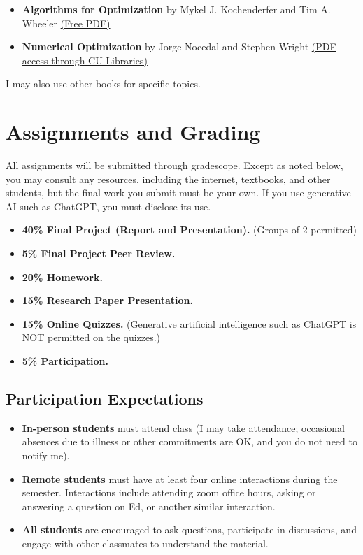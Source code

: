 \documentclass[9pt]{article}
\begin{document}
\begin{itemize}[noitemsep]
    \item \textbf{Algorithms for Optimization} by Mykel J. Kochenderfer and Tim A. Wheeler \href{https://www.algorithmsbook.com/optimization}{(Free PDF)}
    \item \textbf{Numerical Optimization} by Jorge Nocedal and Stephen Wright \href{https://link-springer-com.colorado.idm.oclc.org/book/10.1007/978-0-387-40065-5}{(PDF access through CU Libraries)}
\end{itemize}

I may also use other books for specific topics.

\section*{Assignments and Grading}

All assignments will be submitted through gradescope. Except as noted below, you may consult any resources, including the internet, textbooks, and other students, but the final work you submit must be your own. If you use generative AI such as ChatGPT, you must disclose its use.

\begin{itemize}[noitemsep]
    \item \textbf{40\% Final Project (Report and Presentation).} (Groups of 2 permitted)
    \item \textbf{5\% Final Project Peer Review.}
    \item \textbf{20\% Homework.}
    \item \textbf{15\% Research Paper Presentation.}
    \item \textbf{15\% Online Quizzes.} (Generative artificial intelligence such as ChatGPT is NOT permitted on the quizzes.)
    \item \textbf{5\% Participation.}
\end{itemize}

\subsection*{Participation Expectations}

\begin{itemize}[noitemsep]
    \item \textbf{In-person students} must attend class (I may take attendance; occasional absences due to illness or other commitments are OK, and you do not need to notify me).
    \item \textbf{Remote students} must have at least four online interactions during the semester. Interactions include attending zoom office hours, asking or answering a question on Ed, or another similar interaction.
    \item \textbf{All students} are encouraged to ask questions, participate in discussions, and engage with other classmates to understand the material.
\end{itemize}
\end{document}

